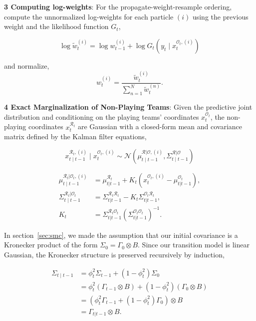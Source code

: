 \textbf{3 Computing log-weights}: For the propagate-weight-resample ordering, compute the unnormalized log-weights for each particle $(i)$ using the previous weight and the likelihood function $G_t$,

\begin{equation}
    \log \tilde{w}_t^{(i)} = \log w_{t-1}^{(i)} +  \log G_t(y_t \mid x_t^{\mathcal{O}_t, (i)}) \nonumber
\end{equation}

and normalize,
\begin{equation}
    w_t^{(i)} = \frac{\tilde{w}_t^{(i)}}{\sum_{n=1}^N \tilde{w}_t^{(n)}}. \nonumber
\end{equation}

\textbf{4 Exact Marginalization of Non-Playing Teams}: Given the predictive joint distribution and conditioning on the playing teams' coordinates $x_t^{\mathcal{O}_t}$, the non-playing coordinates $x_t^{\mathcal{R}_t}$ are Gaussian with a closed-form mean and covariance matrix defined by the Kalman filter equations,

\begin{equation}
    x^{\mathcal{R}_t,(i)}_{t \mid t-1} \mid x^{\mathcal{O}_t,(i)}_{t} \sim \mathcal{N}\left( \mu^{\mathcal{R}|\mathcal{O},(i)}_{t \mid t-1}, \Sigma^{\mathcal{R}|\mathcal{O}}_{t \mid t-1} \right) \nonumber
\end{equation}

\begin{align}
    \mu^{\mathcal{R}_t|\mathcal{O}_t,(i)}_{t \mid t-1} &= \mu_{t|t-1}^{\mathcal{R}_t} + K_t \left( x_t^{\mathcal{O}_t,(i)} - \mu_{t|t-1}^{\mathcal{O}_t} \right), \nonumber \\
    \Sigma^{\mathcal{R}_t|\mathcal{O}_t}_{t \mid t-1} &= \Sigma_{t|t-1}^{\mathcal{R}_t\mathcal{R}_t} - K_t \Sigma_{t|t-1}^{\mathcal{O}_t\mathcal{R}_t}, \nonumber \\
    K_t &= \Sigma_{t|t-1}^{\mathcal{R}_t\mathcal{O}_t} \left( \Sigma_{t|t-1}^{\mathcal{O}_t\mathcal{O}_t} \right)^{-1}. \nonumber
\end{align}

In section~\ref{sec:smc}, we made the assumption that our initial covariance is a Kronecker product of the form $\Sigma_0 = \Gamma_0 \otimes B$. Since our transition model is linear Gaussian, the Kronecker structure is preserved recursively by induction, 

\begin{align}
    \Sigma_{t \mid t-1} &= \phi_t^2 \Sigma_{t-1} + (1 - \phi_t^2) \Sigma_0 \nonumber \\
    &= \phi_t^2 (\Gamma_{t-1} \otimes B) + (1 - \phi_t^2) (\Gamma_0 \otimes B) \nonumber \\
    &= \left( \phi_t^2 \Gamma_{t-1} + (1 - \phi_t^2) \Gamma_0 \right) \otimes B \nonumber \\
    &= \Gamma_{t|t-1} \otimes B. \nonumber
\end{align}

